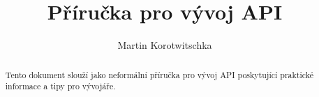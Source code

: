 \documentclass[12pt,a4paper]{article}
\title{Příručka pro vývoj API}
\author{Martin Korotwitschka}
\begin{document}
\maketitle %

\begin{abstract}
    Tento dokument slouží jako neformální příručka pro vývoj API poskytující praktické informace a tipy pro vývojáře.
\end{abstract}

\tableofcontents %

\newpage



\end{document}

